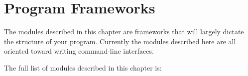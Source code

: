\chapter{Program Frameworks}
\label{frameworks}

The modules described in this chapter are frameworks that will largely
dictate the structure of your program.  Currently the modules described 
here are all oriented toward writing command-line interfaces.

The full list of modules described in this chapter is:

\localmoduletable
